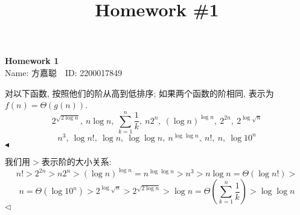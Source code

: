 \documentclass[11pt]{article}
\title{Homework \#1}
\newenvironment{problem}[2][Problem]{\begin{trivlist}
\item[\hskip \labelsep{\bfseries#1}\hskip\labelsep{\bfseries#2.}]}{\hfill$\blacktriangleleft$\end{trivlist}}
\newenvironment{answer}[1][Answer]{\begin{trivlist}
\item[\hskip \labelsep{\bfseries\itshape#1.}\hskip \labelsep]}{\hfill$\lhd$\end{trivlist}}
\begin{document}
\kaishu

\pagestyle{fancy}
\chead{}

\begin{center}
    {\LARGE \bf Homework 1}\\
    {Name: 方嘉聪\ \  ID: 2200017849}            %
\end{center}

\begin{problem}{1 (Textbook 1.18)}
    对以下函数, 按照他们的阶从高到低排序; 如果两个函数的阶相同, 表示为$f(n) = \Theta(g(n))$.
    \[ 2^{\sqrt{2 \log n}}, \ n \log n, \ \sum_{k=1}^n \frac{1}{k}, \ n 2^n, \ (\log n)^{\log n}, \ 2^{2n}, \ 2^{\log \sqrt{n}}  \]
    \[n^3, \ \log{n!}, \ \log n, \ \log\log n, \ n^{\log\log n}, \ n!, \ n, \ \log{10^n}\]
\end{problem}
\begin{answer}
我们用$>$表示阶的大小关系:
\[ n! > 2^{2n} > n 2^n > (\log n)^{\log n} = n^{\log\log n} > n^3 > n \log n = \Theta(\log n!)> \]
\[n = \Theta(\log 10^n) > 2^{\log \sqrt{n}} > 2^{\sqrt{2 \log n}} > \log n = \Theta(\sum_{k=1}^n \frac{1}{k}) > \log\log n\]
\end{answer}
\end{document}
